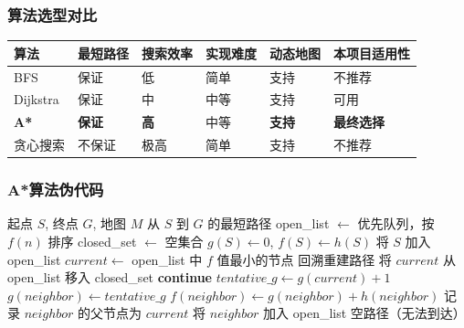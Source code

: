 \documentclass[12pt,a4paper]{article}
\begin{document}
\subsubsection{算法选型对比}

\begin{table}[htbp]
\centering
\begin{tabularx}{\textwidth}{lXXXXX}
\toprule
\textbf{算法} & \textbf{最短路径} & \textbf{搜索效率} & \textbf{实现难度} & \textbf{动态地图} & \textbf{本项目适用性} \\
\midrule
BFS & 保证 & 低 & 简单 & 支持 & 不推荐 \\
Dijkstra & 保证 & 中 & 中等 & 支持 & 可用 \\
\textbf{A*} & \textbf{保证} & \textbf{高} & 中等 & \textbf{支持} & \textbf{最终选择} \\
贪心搜索 & 不保证 & 极高 & 简单 & 支持 & 不推荐 \\
\bottomrule
\end{tabularx}
\end{table}

\subsubsection{A*算法伪代码}

\begin{algorithm}[htbp]
\caption{A*寻路算法}
\begin{algorithmic}[1]
\Require 起点 $S$, 终点 $G$, 地图 $M$
\Ensure 从 $S$ 到 $G$ 的最短路径
\State open\_list $\leftarrow$ 优先队列，按 $f(n)$ 排序
\State closed\_set $\leftarrow$ 空集合
\State $g(S) \leftarrow 0$, $f(S) \leftarrow h(S)$
\State 将 $S$ 加入 open\_list
    \State $current \leftarrow$ open\_list 中 $f$ 值最小的节点
        \State \Return 回溯重建路径
    \EndIf
    \State 将 $current$ 从 open\_list 移入 closed\_set
            \State \textbf{continue}
        \EndIf
        \State $tentative\_g \leftarrow g(current) + 1$
            \State $g(neighbor) \leftarrow tentative\_g$
            \State $f(neighbor) \leftarrow g(neighbor) + h(neighbor)$
            \State 记录 $neighbor$ 的父节点为 $current$
            \State 将 $neighbor$ 加入 open\_list
        \EndIf
    \EndFor
\EndWhile
\State \Return 空路径（无法到达）
\end{algorithmic}
\end{algorithm}
\end{document}
